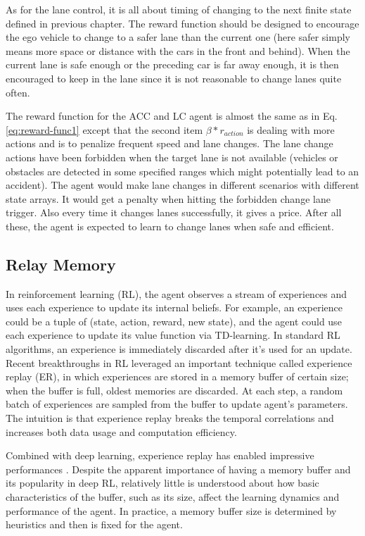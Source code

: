 As for the lane control, it is all about timing of changing to the next finite state defined in previous chapter. The reward function should be designed to encourage the ego vehicle to change to a safer lane than the current one (here safer simply means more space or distance with the cars in the front and behind). When the current lane is safe enough or the preceding car is far away enough, it is then encouraged to keep in the lane since it is not reasonable to change lanes quite often.

The reward function for the ACC and LC agent is almost the same as in Eq. \ref{eq:reward-func1} except that the second item $\beta *  r_{action}$ is dealing with more actions and is to penalize frequent speed and lane changes. The lane change actions have been forbidden when the target lane is not available (vehicles or obstacles are detected in some specified ranges which might potentially lead to an accident). The agent would make lane changes in different scenarios with different state arrays. It would get a penalty when hitting the forbidden change lane trigger. Also every time it changes lanes successfully, it gives a price. After all these, the agent is expected to learn to change lanes when safe and efficient.

\subsection{Relay Memory}

In reinforcement learning (RL), the agent observes a stream of experiences and uses each experience to update its internal beliefs. For example, an experience could be a tuple of (state, action, reward, new state), and the agent could use each experience to update its value function via TD-learning. In standard RL algorithms, an experience is immediately discarded after it's used for an update. Recent breakthroughs in RL leveraged an important technique called experience replay (ER), in which experiences are stored in a memory buffer of certain size; when the buffer is full, oldest memories are discarded. At each step, a random batch of experiences are sampled from the buffer to update agent's parameters. The intuition is that experience replay breaks the temporal correlations and increases both data usage and computation efficiency.

Combined with deep learning, experience replay has enabled impressive performances \cite{Mnih2015AtariNature}. Despite the apparent importance of having a memory buffer and its popularity in deep RL, relatively little is understood about how basic characteristics of the buffer, such as its size, affect the learning dynamics and performance of the agent. In practice, a memory buffer size is determined by heuristics and then is fixed for the agent.

